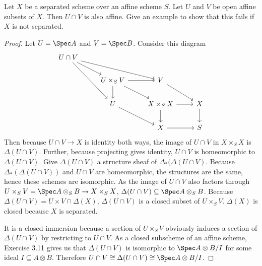 \begin{exercise}%
	Let $X$ be a separated scheme over an affine scheme $S$. Let $U$ and $V$ be open affine subsets of $X$. Then $U \cap V$ is also affine. Give an example to show that this fails if $X$ is not separated.
\end{exercise}
\begin{proof}
	Let $U = \Spec A $ and $V = \Spec B $.
	Consider this diagram
	\[\begin{tikzcd}
		{U\cap V} \\
	& {U\times_S V} & V \\
	& U & {X\times _S X} & X \\
	&& X & S
	\arrow[from=1-1, to=2-2]
	\arrow[from=1-1, to=2-3]
	\arrow[from=1-1, to=3-2]
	\arrow[from=2-2, to=2-3]
	\arrow[from=2-2, to=3-2]
	\arrow[from=2-2, to=3-3]
	\arrow[from=2-3, to=3-4]
	\arrow[from=3-2, to=4-3]
	\arrow[from=3-3, to=3-4]
	\arrow[from=3-3, to=4-3]
	\arrow[from=3-4, to=4-4]
	\arrow[from=4-3, to=4-4]
	\end{tikzcd}\]
	Then because $U\cap V\to X $ is identity both ways, the image of $U\cap V $ in $X\times _S X $ is $\Delta(U \cap V) $.
	Further, because projecting gives identity, $U\cap V $ is homeomorphic to $\Delta(U\cap V) $.
	Give $\Delta(U\cap V) $ a structure sheaf of $\Delta_\ast(\Delta(U\cap V) $.
	Because $\Delta_{\ast}(\Delta(U\cap V))  $ and $U\cap V $ are homeomorphic, the structures are the same, hence these schemes are isomorphic.
	As the image of $U\cap V $ also factors through $U\times _S V = \Spec A \otimes_S B \to X\times _S X$, $\Delta(U\cap V) \subseteq \Spec A \otimes _S B $.
	Because $\Delta(U\cap V) = U \times V \cap \Delta(X)$, $\Delta(U\cap V) $ is a closed subset of $U\times _S V $.
	$\Delta(X) $ is closed because $X $ is separated.

	It is a closed immersion because a section of $U \times_S V $ obviously induces a section of $\Delta(U\cap V) $ by restricting to $U\cap V $.
	As a closed subscheme of an affine scheme, Exercise 3.11 gives us that $\Delta(U\cap V) $ is isomorphic to $\Spec A \otimes B / I $ for some ideal $I \subseteq A \otimes B $.
	Therefore $U\cap V \cong \Delta(U\cap V) \cong \Spec A \otimes B / I $.


\end{proof}
